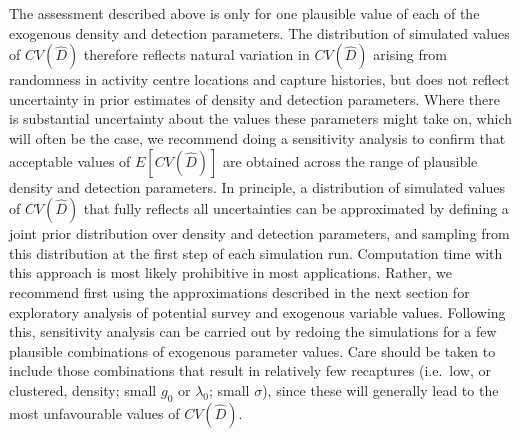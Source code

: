 \documentclass[a4paper,11pt]{article} %
\begin{document}
The assessment described above is only for one plausible value of each of the exogenous density and detection parameters. The distribution of simulated values of $CV(\hat{D})$ therefore reflects natural variation in $CV(\hat{D})$ arising from randomness in activity centre locations and capture histories, but does not reflect uncertainty in prior estimates of density and detection parameters. Where there is substantial uncertainty about the values these parameters might take on, which will often be the case, we recommend doing a sensitivity analysis to confirm that acceptable values of $E[CV(\hat{D})]$ are obtained across the range of plausible density and detection parameters. In principle, a distribution of simulated values of $CV(\hat{D})$ that fully reflects all uncertainties can be approximated by defining a joint prior distribution over density and detection parameters, and sampling from this distribution at the first step of each simulation run. Computation time with this approach is most likely prohibitive in most applications. Rather, we recommend first using the approximations described in the next section for exploratory analysis of potential survey and exogenous variable values. Following this, sensitivity analysis can be carried out by redoing the simulations for a few plausible combinations of exogenous parameter values. Care should be taken to include those combinations that result in relatively few recaptures (i.e.\ low, or clustered, density; small $g_0$ or $\lambda_0$; small $\sigma$), since these will generally lead to the most unfavourable values of $CV(\hat{D})$.
\end{document}
